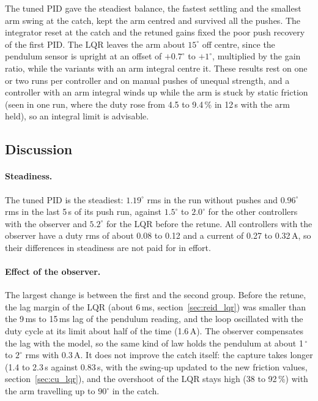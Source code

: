 \documentclass[a4paper,11pt]{article}
\begin{document}
The tuned PID gave the steadiest balance, the fastest settling and the smallest arm swing at the catch, kept the arm centred and survived all the pushes. The integrator reset at the catch and the retuned gains fixed the poor push recovery of the first PID. The LQR leaves the arm about $15^\circ$ off centre, since the pendulum sensor is upright at an offset of $+0.7^\circ$ to $+1^\circ$, multiplied by the gain ratio, while the variants with an arm integral centre it. These results rest on one or two runs per controller and on manual pushes of unequal strength, and a controller with an arm integral winds up while the arm is stuck by static friction (seen in one run, where the duty rose from 4.5 to 9.4\,\% in 12\,s with the arm held), so an integral limit is advisable.

\subsection{Discussion}
\label{sec:cc_discussion}
\paragraph{Steadiness.} The tuned PID is the steadiest: $1.19^\circ$ rms in the run without pushes and $0.96^\circ$ rms in the last 5\,s of its push run, against $1.5^\circ$ to $2.0^\circ$ for the other controllers with the observer and $5.2^\circ$ for the LQR before the retune. All controllers with the observer have a duty rms of about 0.08 to 0.12 and a current of 0.27 to 0.32\,A, so their differences in steadiness are not paid for in effort.

\paragraph{Effect of the observer.} The largest change is between the first and the second group. Before the retune, the lag margin of the LQR (about 6\,ms, section~\ref{sec:reid_lqr}) was smaller than the 9\,ms to 15\,ms lag of the pendulum reading, and the loop oscillated with the duty cycle at its limit about half of the time (1.6\,A). The observer compensates the lag with the model, so the same kind of law holds the pendulum at about 1\,$^\circ$ to $2^\circ$ rms with 0.3\,A. It does not improve the catch itself: the capture takes longer (1.4 to 2.3\,s against 0.83\,s, with the swing-up updated to the new friction values, section~\ref{sec:cu_lqr}), and the overshoot of the LQR stays high (38 to 92\,\%) with the arm travelling up to $90^\circ$ in the catch.
\end{document}
